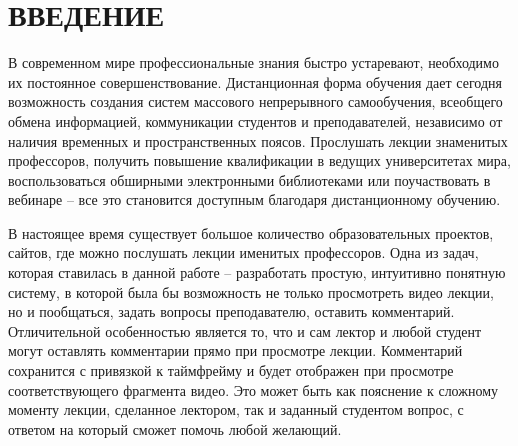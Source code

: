 \section*{ВВЕДЕНИЕ}

В современном мире профессиональные знания быстро устаревают,
необходимо их постоянное совершенствование.
Дистанционная форма обучения дает сегодня возможность создания систем массового непрерывного
самообучения, всеобщего обмена информацией, коммуникации студентов и преподавателей,
независимо от наличия временных и пространственных поясов.
Прослушать лекции знаменитых профессоров, получить повышение квалификации
в ведущих университетах мира, воспользоваться обширными электронными библиотеками
или поучаствовать в вебинаре – все это становится доступным благодаря дистанционному обучению.

В настоящее время существует большое количество образовательных проектов, сайтов,
где можно послушать лекции именитых профессоров.
Одна из задач, которая ставилась в данной работе – разработать простую,
интуитивно понятную систему, в которой была бы возможность не только просмотреть
видео лекции, но и пообщаться, задать вопросы преподавателю, оставить комментарий.
Отличительной особенностью является то, что и сам лектор и любой студент могут оставлять
комментарии прямо при просмотре лекции.
Комментарий сохранится с привязкой к таймфрейму и будет отображен при просмотре
соответствующего фрагмента видео.
Это может быть как пояснение к сложному моменту лекции, сделанное лектором,
так и заданный студентом вопрос, с ответом на который сможет помочь любой желающий.
